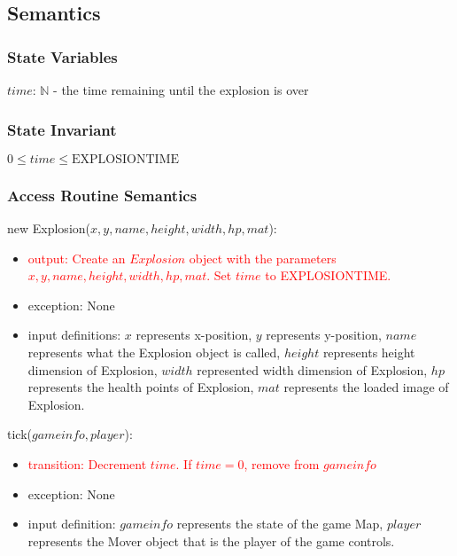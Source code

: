 \documentclass[12pt]{article}
\newcommand{\Implies}{\Rightarrow}
\newcommand{\m}[1]{\mbox{#1}}
\begin{document}
\subsection*{Semantics}

\subsubsection*{State Variables}

$time$: $\mathbb{N}$ - the time remaining until the explosion is over

\subsubsection*{State Invariant}

$0 \leq time \leq \text{EXPLOSIONTIME}$

\subsubsection*{Access Routine Semantics}

new Explosion($x, y, name, height, width, hp, mat$):
\begin{itemize}
    \item \textcolor{red}{output: Create an $Explosion$ object with the parameters $x, y, name, height, width, hp, mat$. Set $time$ to EXPLOSIONTIME.}
    \item exception: None
    \item input definitions: $x$ represents x-position, $y$ represents y-position, $name$ represents what the Explosion object is called, $height$ represents height dimension of Explosion, $width$ represented width dimension of Explosion, $hp$ represents the health points of Explosion, $mat$ represents the loaded image of Explosion.
\end{itemize}

\noindent tick($gameinfo, player$):
\begin{itemize}
    \item \textcolor{red}{transition: Decrement $time$. If $time = 0$, remove from $gameinfo$}
    \item exception: None
    \item input definition: $gameinfo$ represents the state of the game Map, $player$ represents the Mover object that is the player of the game controls.
\end{itemize}
\end{document}
